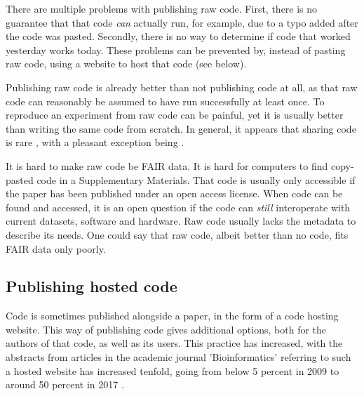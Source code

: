 
There are multiple problems with publishing raw code.
First, there is no guarantee that that code \emph{can} actually
run, for example, due to a typo added after the code was pasted.
Secondly, there is no way to determine if code that worked yesterday
works today. These problems can be prevented by, instead of
pasting raw code, using a website to host that code (see below).


Publishing raw code is already better than not publishing code at all,
as that raw code can reasonably be assumed to have run successfully at least once.
To reproduce an experiment from raw code can be painful, 
yet it is usually better than writing the same code from scratch.
In general, it appears that sharing code is 
rare \cite{stodden2011trust,read2015sizing},
with a pleasant exception being \cite{conesa2019making}.


It is hard to make raw code be FAIR data. It is hard for computers to find
copy-pasted code in a Supplementary Materials. 
That code is usually only accessible
if the paper has been published under an open access license.
When code can be found and accessed, it is an open question if the
code can \emph{still} interoperate with current datasets, software
and hardware. Raw code usually lacks the metadata to describe its needs.
One could say that raw code, albeit better than no code, fits
FAIR data only poorly.

\subsection{Publishing hosted code}

Code is sometimes published alongside a paper, 
in the form of a code hosting website.
This way of publishing code gives additional options,
both for the authors of that code, as well as its users.
This practice has increased,
with the abstracts from articles in the academic journal
'Bioinformatics' referring to such a hosted website
has increased tenfold, going from below 5 percent in 2009 
to around 50 percent in 2017 \cite{russell2018large}.

